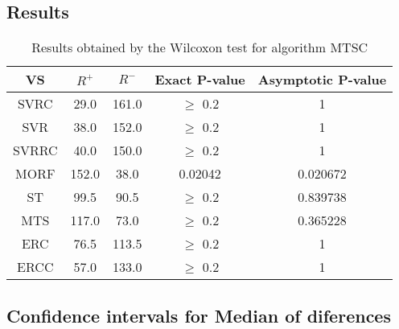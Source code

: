 \documentclass[a4paper,10pt]{article}
\begin{document}
\subsection{Results}

\begin{table}[!htp]
\centering\small
\begin{tabular}{
|c|c|c|c|c|}
\hline
 VS & $R^{+}$ & $R^{-}$ & Exact P-value & Asymptotic P-value \\ \hline 
SVRC & 29.0 & 161.0 & $\geq$ 0.2 & 1\\ \hline 
SVR & 38.0 & 152.0 & $\geq$ 0.2 & 1\\ \hline 
SVRRC & 40.0 & 150.0 & $\geq$ 0.2 & 1\\ \hline 
MORF & 152.0 & 38.0 & 0.02042 & 0.020672\\ \hline 
ST & 99.5 & 90.5 & $\geq$ 0.2 & 0.839738\\ \hline 
MTS & 117.0 & 73.0 & $\geq$ 0.2 & 0.365228\\ \hline 
ERC & 76.5 & 113.5 & $\geq$ 0.2 & 1\\ \hline 
ERCC & 57.0 & 133.0 & $\geq$ 0.2 & 1\\ \hline 

\end{tabular}
\caption{Results obtained by the Wilcoxon test for algorithm MTSC}
\end{table}

\subsection{Confidence intervals for Median of diferences}
\end{document}
